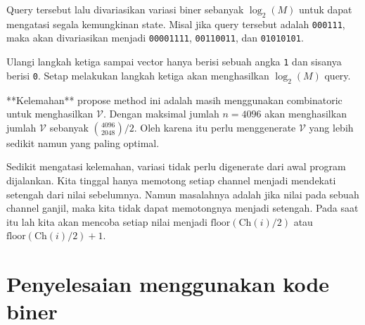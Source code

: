 Query tersebut lalu divariasikan variasi biner sebanyak $\log_2(M)$ untuk dapat mengatasi segala kemungkinan state. Misal jika query tersebut adalah \texttt{000111}, maka akan divariasikan menjadi \texttt{00001111}, \texttt{00110011}, dan \texttt{01010101}.

Ulangi langkah ketiga sampai vector hanya berisi sebuah angka \texttt{1} dan sisanya berisi \texttt{0}. Setap melakukan langkah ketiga akan menghasilkan $\log_2(M)$ query.

**Kelemahan** propose method ini adalah masih menggunakan combinatoric untuk menghasilkan $\mathcal{V}$. Dengan maksimal jumlah $n = 4096$ akan menghasilkan jumlah $\mathcal{V}$ sebanyak $\binom{4096}{2048} / 2$. Oleh karena itu perlu menggenerate $\mathcal{V}$ yang lebih sedikit namun yang paling optimal.

Sedikit mengatasi kelemahan, variasi tidak perlu digenerate dari awal program dijalankan. Kita tinggal hanya memotong setiap channel menjadi mendekati setengah dari nilai sebelumnya. Namun masalahnya adalah jika nilai pada sebuah channel ganjil, maka kita tidak dapat memotongnya menjadi setengah. Pada saat itu lah kita akan mencoba setiap nilai menjadi $\text{floor}(\text{Ch}(i) / 2)$ atau $\text{floor}(\text{Ch}(i) / 2) + 1$.

\section{Penyelesaian menggunakan kode biner}
